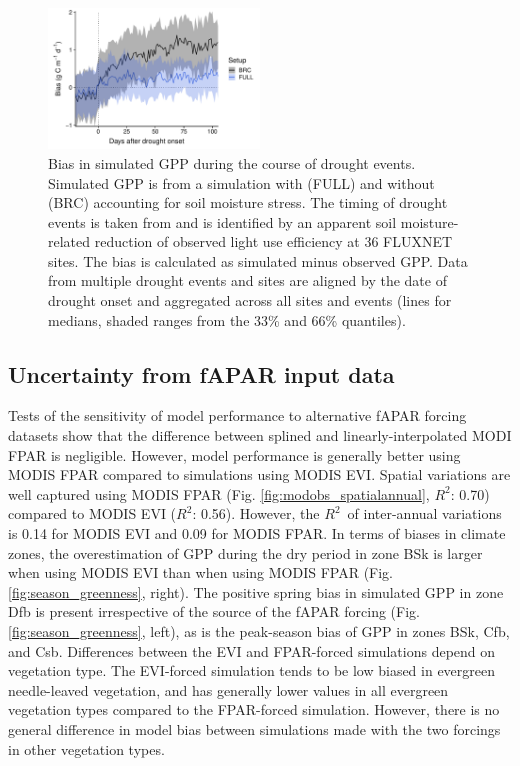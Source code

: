 \documentclass{myreport}
\newcommand{\rsq}{$R^2$}
\begin{document}
\begin{figure}[!ht]
    \centering
\includegraphics[width=0.5\textwidth]{fig/droughtresponse.pdf}
    \caption{Bias in simulated GPP during the course of drought events. Simulated GPP is from a simulation with (FULL) and without (BRC) accounting for soil moisture stress. The timing of drought events is taken from \citet{stocker18newphyt} and is identified by an apparent soil moisture-related reduction of observed light use efficiency at 36 FLUXNET sites. The bias is calculated as simulated minus observed GPP. Data from multiple drought events and sites are aligned by the date of drought onset and aggregated across all sites and events (lines for medians, shaded ranges from the 33\% and 66\% quantiles).}
    \label{fig:modobs_droughtresponse}
\end{figure}


\subsection{Uncertainty from fAPAR input data}
\label{sec:results_greenness}

Tests of the sensitivity of model performance to alternative fAPAR forcing datasets show that the difference between splined and linearly-interpolated MODI FPAR is negligible. However, model performance is generally better using MODIS FPAR compared to simulations using MODIS EVI. Spatial variations are well captured using MODIS FPAR (Fig. \ref{fig:modobs_spatialannual}, \rsq : 0.70) compared to MODIS EVI (\rsq : 0.56). However, the \rsq\ of inter-annual variations is 0.14 for MODIS EVI and 0.09 for MODIS FPAR. In terms of biases in climate zones, the overestimation of GPP during the dry period in zone BSk is larger when using MODIS EVI than when using MODIS FPAR (Fig. \ref{fig:season_greenness}, right). The positive spring bias in simulated GPP in zone Dfb is present irrespective of the source of the fAPAR forcing (Fig. \ref{fig:season_greenness}, left), as is the peak-season bias of GPP in zones BSk, Cfb, and Csb. Differences between the EVI and FPAR-forced simulations depend on vegetation type. The EVI-forced simulation tends to be low biased in evergreen needle-leaved vegetation, and has generally lower values in all evergreen vegetation types compared to the FPAR-forced simulation. However, there is no general difference in model bias between simulations made with the two forcings in other vegetation types. 
\end{document}
